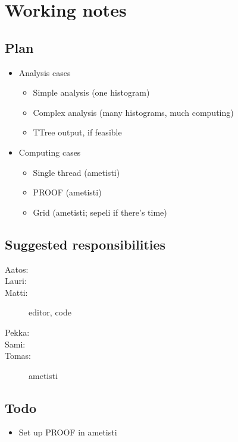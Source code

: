 \appendix
\section{Working notes}

\subsection{Plan}

\begin{itemize}
\item Analysis cases
  \begin{itemize}
  \item Simple analysis (one histogram)
  \item Complex analysis (many histograms, much computing)
  \item TTree output, if feasible
  \end{itemize}
\item Computing cases
  \begin{itemize}
  \item Single thread (ametisti)
  \item PROOF (ametisti)
  \item Grid (ametisti; sepeli if there's time)
  \end{itemize}
\end{itemize}

\subsection{Suggested responsibilities}

\begin{description}
\item[Aatos:]
\item[Lauri:]
\item[Matti:] editor, code
\item[Pekka:]
\item[Sami:]
\item[Tomas:] ametisti
\end{description}

\subsection{Todo}

\begin{itemize}
\item Set up PROOF in ametisti
\end{itemize}
